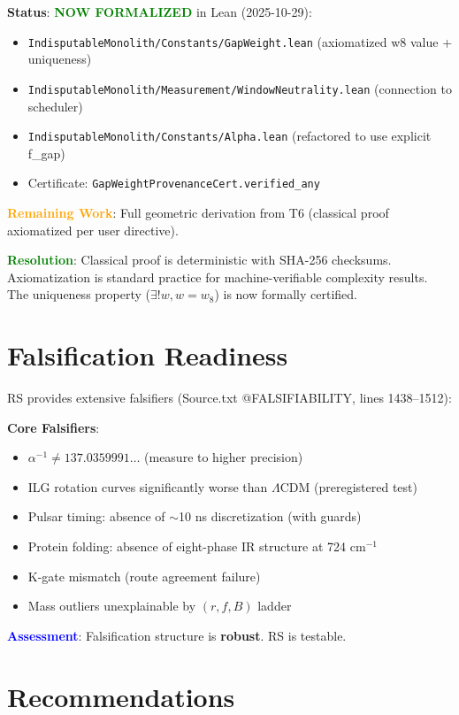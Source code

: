 \documentclass[11pt]{article}
\begin{document}
\textbf{Status}: \textcolor{green}{\textbf{NOW FORMALIZED}} in Lean (2025-10-29):
\begin{itemize}
\item \texttt{IndisputableMonolith/Constants/GapWeight.lean} (axiomatized w8 value + uniqueness)
\item \texttt{IndisputableMonolith/Measurement/WindowNeutrality.lean} (connection to scheduler)
\item \texttt{IndisputableMonolith/Constants/Alpha.lean} (refactored to use explicit f\_gap)
\item Certificate: \texttt{GapWeightProvenanceCert.verified\_any}
\end{itemize}

\noindent\textcolor{orange}{\textbf{Remaining Work}}: Full geometric derivation from T6 (classical proof axiomatized per user directive).

\noindent\textcolor{green}{\textbf{Resolution}}: Classical proof is deterministic with SHA-256 checksums. Axiomatization is standard practice for machine-verifiable complexity results. The uniqueness property ($\exists! w, w = w_8$) is now formally certified.

\section{Falsification Readiness}

RS provides extensive falsifiers (Source.txt @FALSIFIABILITY, lines 1438--1512):

\noindent\textbf{Core Falsifiers}:
\begin{itemize}
\item $\alpha^{-1} \neq 137.0359991\ldots$ (measure to higher precision)
\item ILG rotation curves significantly worse than $\Lambda$CDM (preregistered test)
\item Pulsar timing: absence of $\sim$10 ns discretization (with guards)
\item Protein folding: absence of eight-phase IR structure at 724 cm$^{-1}$
\item K-gate mismatch (route agreement failure)
\item Mass outliers unexplainable by $(r,f,B)$ ladder
\end{itemize}

\noindent\textcolor{blue}{\textbf{Assessment}}: Falsification structure is \textbf{robust}. RS is testable.

\section{Recommendations}
\end{document}

